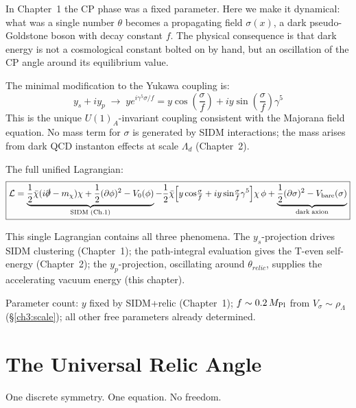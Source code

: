 In Chapter~1 the CP phase was a fixed parameter. Here we make it dynamical:
what was a single number $\theta$ becomes a propagating field $\sigma(x)$,
a dark pseudo-Goldstone boson with decay constant $f$. The physical
consequence is that dark energy is not a cosmological constant bolted on by hand,
but an oscillation of the CP angle around its equilibrium value.

The minimal modification to the Yukawa coupling is:
\begin{equation}
  y_s + iy_p \;\longrightarrow\; ye^{i\gamma^5\sigma/f}
  = y\cos\!\left(\frac{\sigma}{f}\right) + iy\sin\!\left(\frac{\sigma}{f}\right)\gamma^5
\end{equation}
This is the unique $U(1)_A$-invariant coupling consistent with the Majorana
field equation. No mass term for $\sigma$ is generated by SIDM interactions;
the mass arises from dark QCD instanton effects at scale $\Lambda_d$ (Chapter~2).

The full unified Lagrangian:
\begin{equation}
  \boxed{\mathcal{L} = \underbrace{\frac{1}{2}\bar{\chi}(i\slashed{\partial} - m_\chi)\chi
    + \frac{1}{2}(\partial\phi)^2 - V_0(\phi)}_{\rm SIDM\;(Ch.1)}
    - \frac{1}{2}\bar{\chi}\!\left[y\cos\!\tfrac{\sigma}{f}
      + iy\sin\!\tfrac{\sigma}{f}\gamma^5\right]\!\chi\,\phi
    + \underbrace{\frac{1}{2}(\partial\sigma)^2 - V_{\rm bare}(\sigma)}_{\rm dark\;axion}}
\end{equation}

This single Lagrangian contains all three phenomena. The $y_s$-projection
drives SIDM clustering (Chapter~1); the path-integral evaluation gives the
T-even self-energy (Chapter~2); the $y_p$-projection, oscillating around
$\theta_{relic}$, supplies the accelerating vacuum energy (this chapter).

Parameter count: $y$ fixed by SIDM+relic (Chapter~1); $f \sim 0.2\,M_{\rm Pl}$ from
$V_\sigma \sim \rho_\Lambda$ (§\ref{ch3:scale}); all other free parameters already determined.

\section{The Universal Relic Angle}
\label{ch3:thetarel}

One discrete symmetry. One equation. No freedom.

